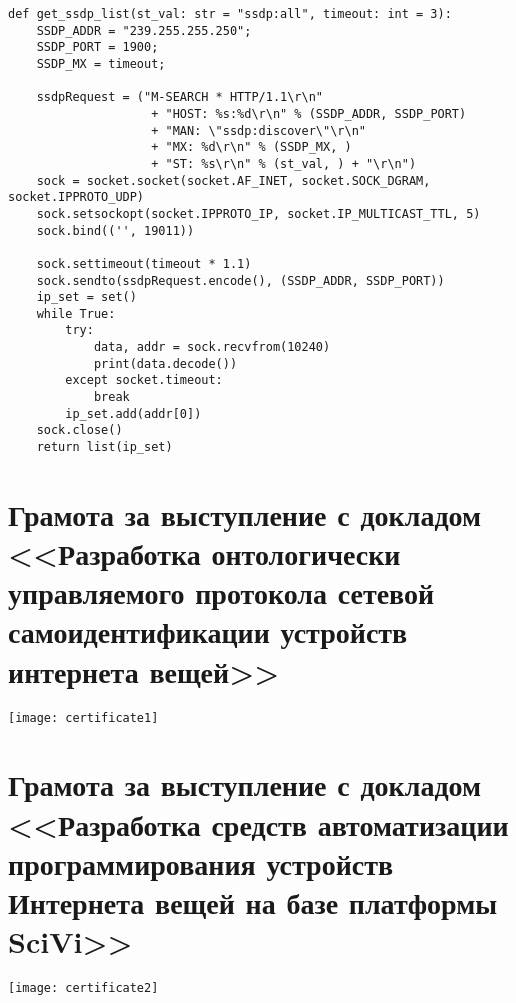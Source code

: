 \begin{verbatim}
def get_ssdp_list(st_val: str = "ssdp:all", timeout: int = 3):
    SSDP_ADDR = "239.255.255.250";
    SSDP_PORT = 1900;
    SSDP_MX = timeout;

    ssdpRequest = ("M-SEARCH * HTTP/1.1\r\n"
                    + "HOST: %s:%d\r\n" % (SSDP_ADDR, SSDP_PORT)
                    + "MAN: \"ssdp:discover\"\r\n"
                    + "MX: %d\r\n" % (SSDP_MX, )
                    + "ST: %s\r\n" % (st_val, ) + "\r\n")
    sock = socket.socket(socket.AF_INET, socket.SOCK_DGRAM, socket.IPPROTO_UDP)
    sock.setsockopt(socket.IPPROTO_IP, socket.IP_MULTICAST_TTL, 5)
    sock.bind(('', 19011))

    sock.settimeout(timeout * 1.1)
    sock.sendto(ssdpRequest.encode(), (SSDP_ADDR, SSDP_PORT))
    ip_set = set()
    while True:
        try:
            data, addr = sock.recvfrom(10240)
            print(data.decode())
        except socket.timeout:
            break
        ip_set.add(addr[0])
    sock.close()
    return list(ip_set)

\end{verbatim}


\chapter{Грамота за выступление с докладом <<Разработка онтологически управляемого протокола сетевой самоидентификации устройств интернета вещей>>}

\texttt{[image: certificate1]}

\chapter{Грамота за выступление с докладом <<Разработка средств автоматизации программирования устройств Интернета вещей на базе платформы SciVi>>}

\texttt{[image: certificate2]}
